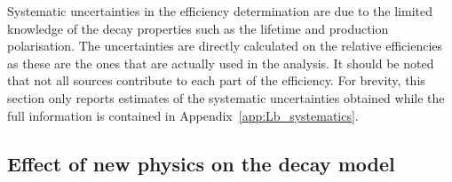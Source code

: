 %
Systematic uncertainties in the efficiency determination are due to the limited knowledge
of the decay properties such as the \Lb lifetime and production polarisation.
The uncertainties are directly calculated on the relative efficiencies as these are the ones that
are actually used in the analysis. It should be noted that not all sources contribute to each part
of the efficiency. For brevity, this section only reports estimates of the systematic
uncertainties obtained while the full information is contained in Appendix~\ref{app:Lb_systematics}.
%

\subsection{Effect of new physics on the decay model}
\label{sec:WCvariation}

